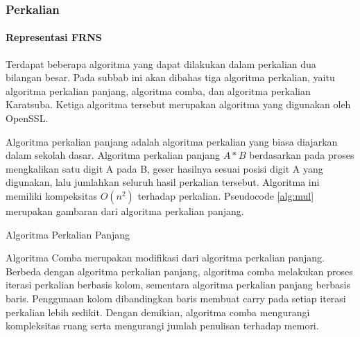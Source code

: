     \subsubsection{Perkalian} \label{sec:mul_theory}

    \paragraph{Representasi FRNS}
    Terdapat beberapa algoritma yang dapat dilakukan dalam perkalian dua bilangan besar. Pada subbab ini akan dibahas tiga algoritma perkalian, yaitu algoritma perkalian panjang, algoritma comba, dan algoritma perkalian Karatsuba. Ketiga algoritma tersebut merupakan algoritma yang digunakan oleh OpenSSL.

    Algoritma perkalian panjang adalah algoritma perkalian yang biasa diajarkan dalam sekolah dasar. Algoritma perkalian panjang $A*B$ berdasarkan pada proses mengkalikan satu digit A pada B, geser hasilnya sesuai posisi digit A yang digunakan, lalu jumlahkan seluruh hasil perkalian tersebut. Algoritma ini memiliki kompeksitas $O(n^2)$ terhadap perkalian. Pseudocode \ref{alg:mul} merupakan gambaran dari algoritma perkalian panjang.

    \begin{algorithm}
      \caption{Algoritma Perkalian Panjang}
        \label{alg:mul}
      \begin{algorithmic}[1]
        \Statex
            \EndFor
          \EndFor
          \State {}
        \EndFunction
      \end{algorithmic}
    \end{algorithm}

    Algoritma Comba merupakan modifikasi dari algoritma perkalian panjang. Berbeda dengan algoritma perkalian panjang, algoritma comba melakukan proses iterasi perkalian berbasis kolom, sementara algoritma perkalian panjang berbasis baris. Penggunaan kolom dibandingkan baris membuat carry pada setiap iterasi perkalian lebih sedikit. Dengan demikian, algoritma comba mengurangi kompleksitas ruang serta mengurangi jumlah penulisan terhadap memori.

